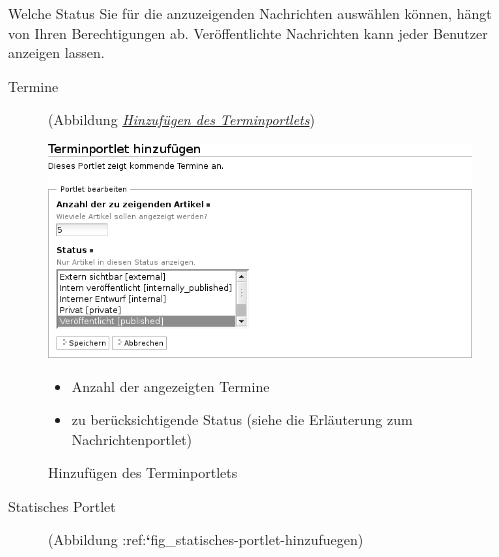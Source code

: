 \documentclass[a4paper,12pt,ngerman]{manual}
\begin{document}
Welche Status Sie für die anzuzeigenden Nachrichten auswählen können, hängt
von Ihren Berechtigungen ab. Veröffentlichte Nachrichten kann jeder Benutzer
anzeigen lassen.
\begin{description}
\item[Termine] \leavevmode
(Abbildung \hyperlink{fig-terminportlet-hinzufuegen}{\emph{Hinzufügen des Terminportlets}})

\end{description}
\hypertarget{fig-terminportlet-hinzufuegen}{}\begin{figure}[htbp]
\centering

\includegraphics{terminportlet-hinzufuegen.png}
\caption{Hinzufügen des Terminportlets}{\small \begin{itemize}
\item {} 
Anzahl der angezeigten Termine

\item {} 
zu berücksichtigende Status (siehe die Erläuterung zum
Nachrichtenportlet)

\end{itemize}
}\end{figure}
\hypertarget{sec-statisches-portlet-hinzufuegen}{}\begin{description}
\item[Statisches Portlet] \leavevmode
(Abbildung :ref:{\color{red}\bfseries{}{}`}fig\_statisches-portlet-hinzufuegen)

\end{description}
\end{document}
